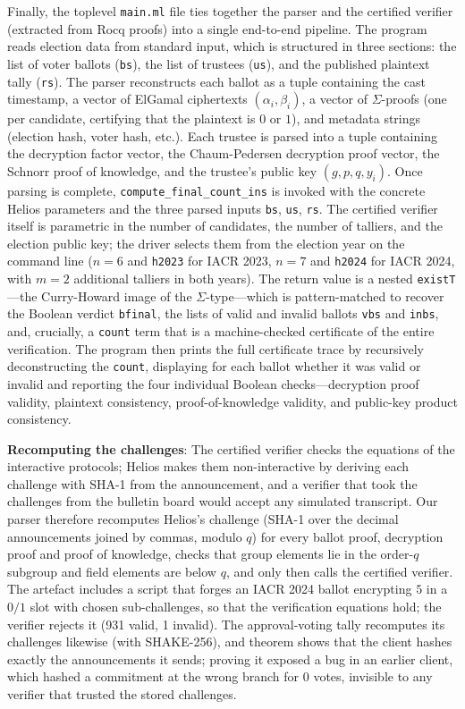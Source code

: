 Finally, the toplevel \texttt{main.ml} file ties together the parser
and the certified verifier (extracted from Rocq proofs) into a single end-to-end pipeline.
The program reads election data from standard input, which is structured
in three sections: the list of voter ballots
(\texttt{bs}), the list of trustees (\texttt{us}), and the published
plaintext tally (\texttt{rs}).
The parser reconstructs each ballot as a tuple containing the cast timestamp,
a vector of ElGamal ciphertexts $(\alpha_i, \beta_i)$, a vector of $\Sigma$-proofs (one per candidate, certifying that the plaintext is $0$ or $1$),
and metadata strings (election hash, voter hash, etc.).
Each trustee is parsed into a tuple containing the decryption factor vector,
the Chaum-Pedersen decryption proof vector, the Schnorr proof of knowledge,
and the trustee's public key $(g, p, q, y_i)$. Once parsing is complete, \texttt{compute\_final\_count\_ins} is invoked
with the concrete Helios parameters and the three parsed inputs
\texttt{bs}, \texttt{us}, \texttt{rs}. The certified verifier itself is
parametric in the number of candidates, the number of talliers, and the
election public key; the driver selects them from the election year on the
command line ($n = 6$ and \texttt{h2023} for IACR 2023, $n = 7$ and
\texttt{h2024} for IACR 2024, with $m = 2$ additional talliers in both years).
The return value is a nested \texttt{existT}---the Curry-Howard
image of the $\Sigma$-type---which is pattern-matched to recover the
Boolean verdict \texttt{bfinal}, the lists of valid and invalid ballots
\texttt{vbs} and \texttt{inbs}, and, crucially, a \texttt{count} term
that is a machine-checked certificate of the entire verification.
The program then prints the full certificate trace by
recursively deconstructing the \texttt{count}, displaying for
each ballot whether it was valid or invalid and reporting the four individual Boolean checks---decryption proof
validity, plaintext consistency, proof-of-knowledge validity, and public-key product consistency.

\textbf{Recomputing the challenges}: The certified verifier checks the equations of the interactive protocols; Helios makes them non-interactive by deriving each challenge with SHA-1 from the announcement, and a verifier that took the challenges from the bulletin board would accept any simulated transcript. Our parser therefore recomputes Helios's challenge (SHA-1 over the decimal announcements joined by commas, modulo $q$) for every ballot proof, decryption proof and proof of knowledge, checks that group elements lie in the order-$q$ subgroup and field elements are below $q$, and only then calls the certified verifier. The artefact includes a script that forges an IACR 2024 ballot encrypting $5$ in a $0/1$ slot with chosen sub-challenges, so that the verification equations hold; the verifier rejects it (931 valid, 1 invalid). The approval-voting tally recomputes its challenges likewise (with SHAKE-256), and theorem \texttt{} shows that the client hashes exactly the announcements it sends; proving it exposed a bug in an earlier client, which hashed a commitment at the wrong branch for $0$ votes, invisible to any verifier that trusted the stored challenges.

